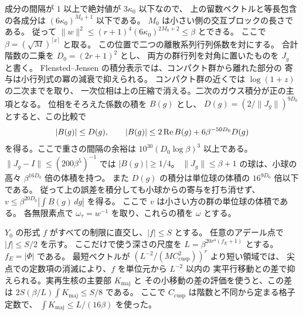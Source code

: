 成分の間隔が \(1\) 以上で絶対値が \(3\kappa_0\) 以下なので、
上の留数ベクトルと等長包含の各成分は \((6\kappa_0)^{M_0+1}\) 以下である。
\(M_0\) は小さい側の交互ブロックの長さである。
従って \(\|w\|^2\le(r+1)^4(6\kappa_0)^{2M_0+2}\le\beta\) とできる。
ここで \(\beta=(\sqrt M)^{\lceil x\rceil}\) と取る。
この位置で二つの離散系列行列係数を対にする。
合計階数の二乗を \(D_0=(2r+1)^2\) とし、
両方の群行列を対角に置いたものを \(J_g\) と書く。
Flensted--Jensen の積分表示では、コンパクト群から離れた部分の
寄与は小行列式の冪の減衰で抑えられる。
コンパクト群の近くでは \(\log(1+z)\) の二次までを取り、
一次位相は上の圧縮で消える。二次のガウス積分が正の主項となる。
位相をそろえた係数の積を \(B(g)\) とし、
\(D(g)=(2/\|J_g\|)^{9D_0}\) とすると、この比較で
\[
 |B(g)|\le D(g),\qquad
 |B(g)|\le 2\operatorname{Re} B(g)+6\beta^{-50D_0}D(g)
\]
を得る。ここで重さの間隔の余裕は
\(10^{30}(D_0\log\beta)^3\) 以上である。
\(\|J_g-I\|\le(200\beta^5)^{-1}\) では \(|B(g)|\ge1/4\)。
\(\|J_g\|\le\beta+1\) の球は、小球の高々 \(\beta^{16D_0}\) 倍の体積を持つ。
また \(D(g)\) の積分は単位球の体積の \(16^{9D_0}\) 倍以下である。
従って上の誤差を積分しても小球からの寄与を打ち消せず、
\(\displaystyle v\le\beta^{20D_0}|\int B(g)\,dg|\) を得る。
ここで \(v\) は小さい方の群の単位球の体積である。
各無限素点で \(\omega_\tau=w^{-1}\) を取り、これらの積を \(\omega\) とする。

\(Y_0\) の形式 \(f\) がすべての制限に直交し、\(|f|\le S\) とする。
任意のアデール点で \(|f|\le S/2\) を示す。
ここだけで使う深さの尺度を
\(L=\beta^{20r^4(f_E+1)}\) とする。\(f_E=|\Phi|\) である。
最短ベクトルが
\((L^{-2}/(M C_{\mathrm{cusp}}^2))^r\) より短い領域では、
尖点での定数項の消滅により、\(f\) を単位元から \(L^{-2}\) 以内の
実平行移動との差で抑えられる。実再生核の主要部 \(K_\mathrm{maj}\) と
その小移動の差の評価を使うと、この差は
\(2S(\beta/L)\int K_\mathrm{maj}\le S/8\) である。
ここで \(C_{\mathrm{cusp}}\) は階数と不同から定まる格子定数で、
\(\int K_\mathrm{maj}\le L/(16\beta)\) を使った。

